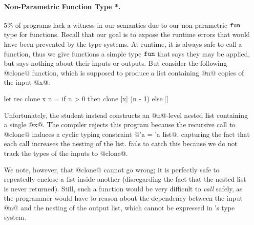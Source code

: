 

\paragraph{Non-Parametric Function Type *.}
%
5\% of programs lack a witness in our semantics due to our
non-parametric $\mathtt{fun}$ type for functions.
%
Recall that our goal is to expose the runtime errors that would have
been prevented by the type systems.
%
At runtime, it is always safe to call a function, thus we give functions
a simple type $\mathtt{fun}$ that says they may be applied, but says nothing
about their inputs or outputs.
%
But consider the following @clone@ function, which is supposed to
produce a list containing @n@ copies of the input @x@.
%
%
\begin{code}
  let rec clone x n =
    if n > 0 then
      clone [x] (n - 1)
    else
      []
\end{code}
%
Unfortunately, the student instead constructs an @n@-level nested list
containing a single @x@.
%
The \ocaml compiler rejects this program because the recursive call to
@clone@ induces a cyclic typing constraint @'a = 'a list@, capturing the
fact that each call increases the nesting of the list.
%
\toolname fails to catch this because we do not track the types of the
inputs to @clone@.

We note, however, that @clone@ cannot go wrong; it is perfectly safe to
repeatedly enclose a list inside another (disregarding the fact that the
nested list is never returned).
%
Still, such a function would be very difficult to \emph{call} safely, as
the programmer would have to reason about the dependency between the
input @n@ and the nesting of the output list, which cannot be expressed
in \ocaml's type system.

